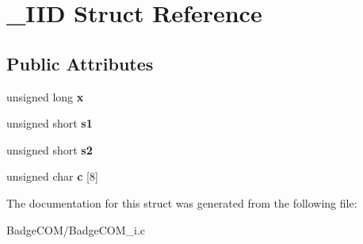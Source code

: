 \hypertarget{struct___i_i_d}{\section{\-\_\-\-I\-I\-D Struct Reference}
\label{struct___i_i_d}
}
\subsection*{Public Attributes}
\begin{DoxyCompactItemize}
\item 
\hypertarget{struct___i_i_d_add28d3db785dd98f1178f7ea88f5495c}{unsigned long {\bfseries x}}\label{struct___i_i_d_add28d3db785dd98f1178f7ea88f5495c}

\item 
\hypertarget{struct___i_i_d_a23024837c1b267b2fe58b64d57b509da}{unsigned short {\bfseries s1}}\label{struct___i_i_d_a23024837c1b267b2fe58b64d57b509da}

\item 
\hypertarget{struct___i_i_d_afbdacab5216098be663859a1d2764de7}{unsigned short {\bfseries s2}}\label{struct___i_i_d_afbdacab5216098be663859a1d2764de7}

\item 
\hypertarget{struct___i_i_d_a075b5d7c1adb4b54b329cef0d43dc3c0}{unsigned char {\bfseries c} \mbox{[}8\mbox{]}}\label{struct___i_i_d_a075b5d7c1adb4b54b329cef0d43dc3c0}

\end{DoxyCompactItemize}


The documentation for this struct was generated from the following file\-:\begin{DoxyCompactItemize}
\item 
Badge\-C\-O\-M/Badge\-C\-O\-M\-\_\-i.\-c\end{DoxyCompactItemize}
